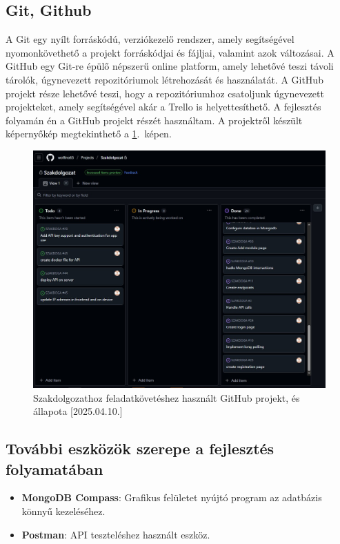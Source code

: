 \documentclass{thesis-ekf}
\theoremstyle{definition}
\theoremstyle{remark}
\begin{document}
	\subsection{Git, Github}
	A Git egy nyílt forráskódú, verziókezelő rendszer, amely segítségével nyomonkövethető a projekt forráskódjai és fájljai, valamint azok változásai. A GitHub egy Git-re épülő népszerű online platform, amely lehetővé teszi távoli tárolók, úgynevezett repozitóriumok létrehozását és használatát. A GitHub projekt része lehetővé teszi, hogy a repozitóriumhoz csatoljunk úgynevezett projekteket, amely segítségével akár a Trello is helyettesíthető. A fejlesztés folyamán én a GitHub projekt részét használtam. A projektről készült képernyőkép megtekinthető a \ref{img_git}.~képen.
	\begin{figure}[!ht]
		\centering
		\includegraphics[width=15cm]{github_project}
		\caption{Szakdolgozathoz feladatkövetéshez használt GitHub projekt, és állapota [2025.04.10.]}
		\label{img_git}
	\end{figure}
	\subsection{További eszközök szerepe a fejlesztés folyamatában}
	\begin{itemize}
		\item \textbf{MongoDB Compass}: Grafikus felületet nyújtó program az adatbázis könnyű kezeléséhez.
		\item \textbf{Postman}: API teszteléshez használt eszköz.
	\end{itemize}
\end{document}
